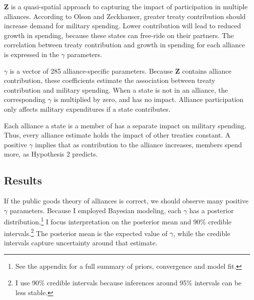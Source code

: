 \documentclass[12pt]{article}
\begin{document}
\textbf{Z} is a quasi-spatial approach to capturing the impact of participation in multiple alliances. 
According to Olson and Zeckhauser, greater treaty contribution should increase demand for military spending. 
Lower contribution will lead to reduced growth in spending, because these states can free-ride on their partners.
The correlation between treaty contribution and growth in spending for each alliance is expressed in the $\gamma$ parameters. 


$\gamma$ is a vector of 285 alliance-specific parameters.  
Because \textbf{Z} contains alliance contribution, these coefficients estimate the association between treaty contribution and military spending. 
When a state is not in an alliance, the corresponding $\gamma$ is multiplied by zero, and has no impact. 
Alliance participation only affects military expenditures if a state contributes. 


Each alliance a state is a member of has a separate impact on military spending.
Thus, every alliance estimate holds the impact of other treaties constant. 
A positive $\gamma$ implies that as contribution to the alliance increases, members spend more, as Hypothesis 2 predicts. 
    


\subsection{Results} 


If the public goods theory of alliances is correct, we should observe many positive $\gamma$ parameters. 
Because I employed Bayesian modeling, each $\gamma$ has a posterior distribution.\footnote{See the appendix for a full summary of priors, convergence and model fit.} 
I focus interpretation on the posterior mean and 90\% credible intervals.\footnote{I use 90\% credible intervals because inferences around 95\% intervals can be less stable.}
The posterior mean is the expected value of $\gamma$, while the credible intervals capture uncertainty around that estimate.  
\end{document}
